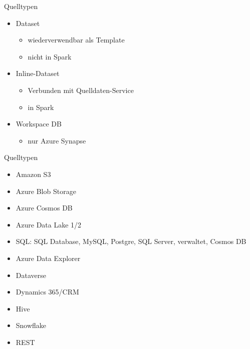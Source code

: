 \begin{flashcard}[Definition]{Quelltypen}
  \begin{itemize}
    \item Dataset
      \begin{itemize}
        \item wiederverwendbar als Template
        \item nicht in Spark
      \end{itemize}
    \item Inline-Dataset
      \begin{itemize}
        \item Verbunden mit Quelldaten-Service
        \item in Spark
      \end{itemize}
    \item Workspace DB
      \begin{itemize}
        \item nur Azure Synapse
      \end{itemize}
  \end{itemize}
\end{flashcard}

\begin{flashcard}[Definition]{Quelltypen}
  \begin{itemize}
    \item Amazon S3
    \item Azure Blob Storage
    \item Azure Cosmos DB
    \item Azure Data Lake 1/2
    \item SQL: SQL Database, MySQL, Postgre, SQL Server, verwaltet, Cosmos DB
    \item Azure Data Explorer
    \item Dataverse
    \item Dynamics 365/CRM
    \item Hive
    \item Snowflake
    \item REST
  \end{itemize}
\end{flashcard}


